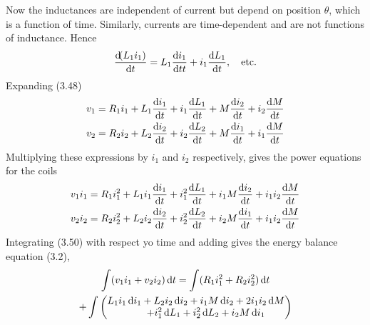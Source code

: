 \documentclass[a4paper,numbers=noenddot,12pt]{scrbook}
\begin{document}
            Now the inductances are independent of current but depend on position $\theta$, which is a function of time. Similarly, currents are time-dependent and are not functions of inductance. Hence
            \begin{equation*}
                \dfrac{\dif (L_1 i_1)}{\dif t} = L_1 \dfrac{\dif i_1}{\dif t t} + i_1 \dfrac{\dif L_1}{\dif t},\quad \text{etc.}
            \end{equation*}
            Expanding (3.48)
            \begin{equation}
                \begin{aligned}
                    v_1 & = R_1 i_1 + L_1 \dfrac{\dif i_1}{\dif t} + i_1 \dfrac{\dif L_1}{\dif t} + M \dfrac{\dif i_2}{\dif t} + i_2 \dfrac{\dif M}{\dif t} \\
                    v_2 & = R_2 i_2 + L_2 \dfrac{\dif i_2}{\dif t} + i_2 \dfrac{\dif L_2}{\dif t} + M \dfrac{\dif i_1}{\dif t} + i_1 \dfrac{\dif M}{\dif t}
                \end{aligned}
                \label{eq:Eq3.49}
            \end{equation}
            Multiplying these expressions by $i_1$ and $i_2$ respectively, gives the power equations for the coils
            \begin{equation}
                \begin{aligned}
                    v_1 i_1 & = R_1 i_1^2 + L_1 i_1 \dfrac{\dif i_1}{\dif t} + i_1^2 \dfrac{\dif L_1}{\dif t} + i_1 M \dfrac{\dif i_2}{\dif t} + i_1 i_2 \dfrac{\dif M}{\dif t} \\
                    v_2 i_2 & = R_2 i_2^2 + L_2 i_2 \dfrac{\dif i_2}{\dif t} + i_2^2 \dfrac{\dif L_2}{\dif t} + i_2 M \dfrac{\dif i_1}{\dif t} + i_1 i_2 \dfrac{\dif M}{\dif t}
                \end{aligned}
                \label{eq:Eq3.50}
            \end{equation}
            Integrating (3.50) with respect yo time and adding gives the energy balance equation (3.2),
            \begin{multline}
                \int (v_1 i_1 + v_2 i_2) \dif t = \int (R_1 i_1^2 + R_2 i_2^2) \dif t \\
                + \int
                \begin{pmatrix}
                    L_1 i_1 \dif i_1 + L_2 i_2 \dif i_2 + i_1 M \dif i_2 + 2 i_1 i_2 \dif M\\
                    \qquad + i_1^2 \dif L_1 + i_2^2 \dif L_2 + i_2 M \dif i_1
                \end{pmatrix}
                \label{eq:Eq3.51}
            \end{multline}
\end{document}
